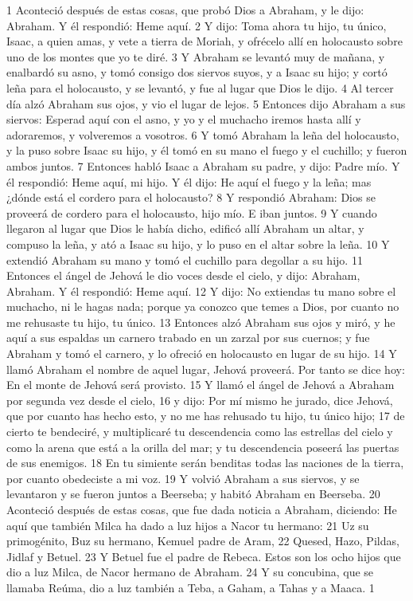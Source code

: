 1 Aconteció después de estas cosas, que probó Dios a Abraham, y le dijo: Abraham. Y él respondió: Heme aquí.
2 Y dijo: Toma ahora tu hijo, tu único, Isaac, a quien amas, y vete a tierra de Moriah, y ofrécelo allí en holocausto sobre uno de los montes que yo te diré.
3 Y Abraham se levantó muy de mañana, y enalbardó su asno, y tomó consigo dos siervos suyos, y a Isaac su hijo; y cortó leña para el holocausto, y se levantó, y fue al lugar que Dios le dijo.
4 Al tercer día alzó Abraham sus ojos, y vio el lugar de lejos.
5 Entonces dijo Abraham a sus siervos: Esperad aquí con el asno, y yo y el muchacho iremos hasta allí y adoraremos, y volveremos a vosotros.
6 Y tomó Abraham la leña del holocausto, y la puso sobre Isaac su hijo, y él tomó en su mano el fuego y el cuchillo; y fueron ambos juntos.
7 Entonces habló Isaac a Abraham su padre, y dijo: Padre mío. Y él respondió: Heme aquí, mi hijo. Y él dijo: He aquí el fuego y la leña; mas ¿dónde está el cordero para el holocausto?
8 Y respondió Abraham: Dios se proveerá de cordero para el holocausto, hijo mío. E iban juntos.
9 Y cuando llegaron al lugar que Dios le había dicho, edificó allí Abraham un altar, y compuso la leña, y ató a Isaac su hijo, y lo puso en el altar sobre la leña.
10 Y extendió Abraham su mano y tomó el cuchillo para degollar a su hijo.
11 Entonces el ángel de Jehová le dio voces desde el cielo, y dijo: Abraham, Abraham. Y él respondió: Heme aquí.
12 Y dijo: No extiendas tu mano sobre el muchacho, ni le hagas nada; porque ya conozco que temes a Dios, por cuanto no me rehusaste tu hijo, tu único.
13 Entonces alzó Abraham sus ojos y miró, y he aquí a sus espaldas un carnero trabado en un zarzal por sus cuernos; y fue Abraham y tomó el carnero, y lo ofreció en holocausto en lugar de su hijo.
14 Y llamó Abraham el nombre de aquel lugar, Jehová proveerá. Por tanto se dice hoy: En el monte de Jehová será provisto.
15 Y llamó el ángel de Jehová a Abraham por segunda vez desde el cielo,
16 y dijo: Por mí mismo he jurado, dice Jehová, que por cuanto has hecho esto, y no me has rehusado tu hijo, tu único hijo;
17 de cierto te bendeciré, y multiplicaré tu descendencia como las estrellas del cielo y como la arena que está a la orilla del mar; y tu descendencia poseerá las puertas de sus enemigos.
18 En tu simiente serán benditas todas las naciones de la tierra, por cuanto obedeciste a mi voz.
19 Y volvió Abraham a sus siervos, y se levantaron y se fueron juntos a Beerseba; y habitó Abraham en Beerseba.
20 Aconteció después de estas cosas, que fue dada noticia a Abraham, diciendo: He aquí que también Milca ha dado a luz hijos a Nacor tu hermano:
21 Uz su primogénito, Buz su hermano, Kemuel padre de Aram,
22 Quesed, Hazo, Pildas, Jidlaf y Betuel.
23 Y Betuel fue el padre de Rebeca. Estos son los ocho hijos que dio a luz Milca, de Nacor hermano de Abraham.
24 Y su concubina, que se llamaba Reúma, dio a luz también a Teba, a Gaham, a Tahas y a Maaca.
1 

